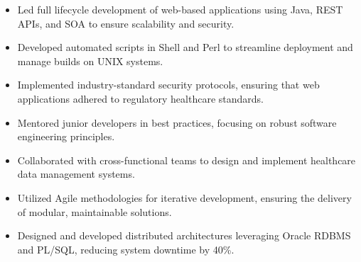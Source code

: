 \par\smallskip
\noindent
\begin{minipage}{20cm}
  \begin{minipage}{9.75cm}
    \begin{itemize}
      \item Led full lifecycle development of web-based applications using Java, REST APIs, and SOA to ensure scalability and security.
      \item Developed automated scripts in Shell and Perl to streamline deployment and manage builds on UNIX systems.
    \end{itemize}
  \end{minipage}
  \hfill
  \begin{minipage}{9.75cm}
    \begin{itemize}
      \item Implemented industry-standard security protocols, ensuring that web applications adhered to regulatory healthcare standards.
      \item Mentored junior developers in best practices, focusing on robust software engineering principles.
    \end{itemize}
  \end{minipage}
\end{minipage}
\par\smallskip
\divider

\par\smallskip
\noindent
\begin{minipage}{20cm}
  \begin{minipage}{9.75cm}
    \begin{itemize}
      \item Collaborated with cross-functional teams to design and implement healthcare data management systems.
      \item Utilized Agile methodologies for iterative development, ensuring the delivery of modular, maintainable solutions.
    \end{itemize}
  \end{minipage}
  \hfill
  \begin{minipage}{9.75cm}
    \begin{itemize}
      \item Designed and developed distributed architectures leveraging Oracle RDBMS and PL/SQL, reducing system downtime by 40\%.
    \end{itemize}
  \end{minipage}
\end{minipage}

